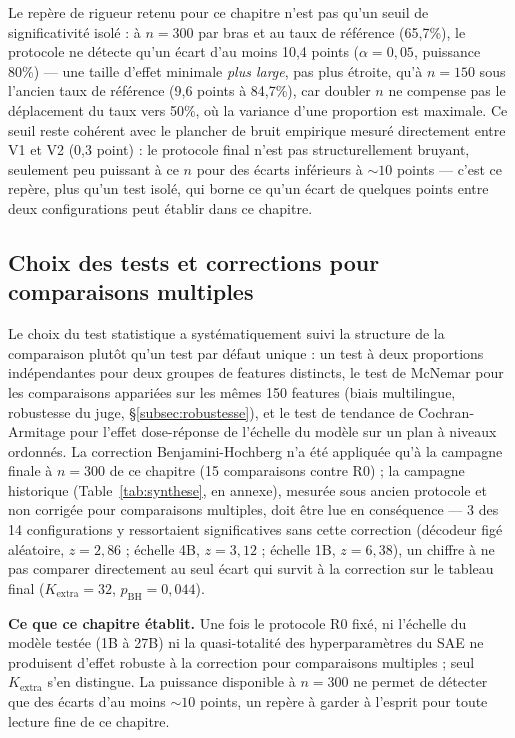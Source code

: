 \documentclass[11pt]{article}
\begin{document}
\begin{resultbox}
Le repère de rigueur retenu pour ce chapitre n'est pas qu'un seuil de
significativité isolé : à $n=300$ par bras et au taux de référence (65,7\%),
le protocole ne détecte qu'un écart d'au moins 10,4 points ($\alpha=0{,}05$,
puissance 80\%) --- une taille d'effet minimale \emph{plus large}, pas plus
étroite, qu'à $n=150$ sous l'ancien taux de référence (9,6 points à
84,7\%), car doubler $n$ ne compense pas le déplacement du taux vers 50\%,
où la variance d'une proportion est maximale. Ce seuil reste cohérent avec
le plancher de bruit empirique mesuré directement entre V1 et V2 (0,3 point)
: le protocole final n'est pas structurellement bruyant, seulement peu
puissant à ce $n$ pour des écarts inférieurs à ${\sim}10$ points --- c'est ce
repère, plus qu'un test isolé, qui borne ce qu'un écart de quelques points
entre deux configurations peut établir dans ce chapitre.
\end{resultbox}

\subsection{Choix des tests et corrections pour comparaisons multiples}
\label{subsec:audit-stats}

Le choix du test statistique a systématiquement suivi la structure de la
comparaison plutôt qu'un test par défaut unique : un test à deux proportions
indépendantes pour deux groupes de features distincts, le test de McNemar
pour les comparaisons appariées sur les mêmes 150 features (biais
multilingue, robustesse du juge, \S\ref{subsec:robustesse}), et le test de
tendance de Cochran-Armitage pour l'effet dose-réponse de l'échelle du
modèle sur un plan à niveaux ordonnés. La correction Benjamini-Hochberg n'a
été appliquée qu'à la campagne finale à $n=300$ de ce chapitre (15
comparaisons contre R0) ; la campagne historique (Table~\ref{tab:synthese},
en annexe), mesurée sous ancien protocole et non corrigée pour comparaisons
multiples, doit être lue en conséquence --- 3 des 14 configurations y
ressortaient significatives sans cette correction (décodeur figé aléatoire,
$z=2{,}86$ ; échelle 4B, $z=3{,}12$ ; échelle 1B, $z=6{,}38$), un chiffre à
ne pas comparer directement au seul écart qui survit à la correction sur le
tableau final ($K_\text{extra}=32$, $p_\text{BH}=0{,}044$).

\medskip
\noindent\textbf{Ce que ce chapitre établit.} Une fois le protocole R0 fixé,
ni l'échelle du modèle testée (1B à 27B) ni la quasi-totalité des
hyperparamètres du SAE ne produisent d'effet robuste à la correction pour
comparaisons multiples ; seul $K_\text{extra}$ s'en distingue. La puissance
disponible à $n=300$ ne permet de détecter que des écarts d'au moins
${\sim}10$ points, un repère à garder à l'esprit pour toute lecture fine de
ce chapitre.
\end{document}
